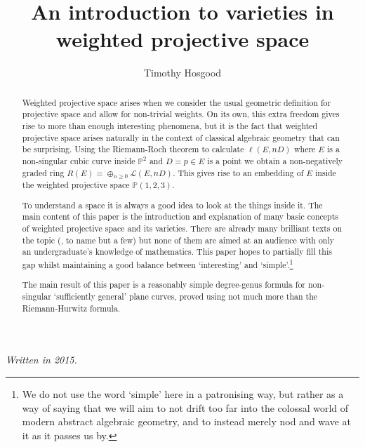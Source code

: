 \documentclass[10pt,notitlepage]{article}
\makeatletter
\newcommand{\draftwatermarkoff}{%
  \let\sc@watermark\@empty
}
\numberwithin{equation}{subsection}
\newcommand{\pee}{\mathbb{P}}
\makeatother
\begin{document}
\draftwatermarkoff

    
    \author{Timothy Hosgood}
    \title{An introduction to varieties in weighted projective space}
    \maketitle

    \emph{Written in 2015.}


    \begin{abstract}
        Weighted projective space arises when we consider the usual geometric definition for projective space and allow for non-trivial weights.
        On its own, this extra freedom gives rise to more than enough interesting phenomena, but it is the fact that weighted projective space arises naturally in the context of classical algebraic geometry that can be surprising.
        Using the Riemann-Roch theorem to calculate $\ell(E,nD)$ where $E$ is a non-singular cubic curve inside $\pee^2$ and $D=p\in E$ is a point we obtain a non-negatively graded ring $R(E)=\oplus_{n\geqslant0}\mathcal{L}(E,nD)$.
        This gives rise to an embedding of $E$ inside the weighted projective space $\pee(1,2,3)$.

        To understand a space it is always a good idea to look at the things inside it.
        The main content of this paper is the introduction and explanation of many basic concepts of weighted projective space and its varieties.
        There are already many brilliant texts on the topic (\cite{Reid:2002uy,IanoFletcher:2015wc}, to name but a few) but none of them are aimed at an audience with only an undergraduate's knowledge of mathematics.
        This paper hopes to partially fill this gap whilst maintaining a good balance between `interesting' and `simple'.\footnote{%
            We do not use the word `simple' here in a patronising way, but rather as a way of saying that we will aim to not drift too far into the colossal world of modern abstract algebraic geometry, and to instead merely nod and wave at it as it passes us by.
        }

        The main result of this paper is a reasonably simple degree-genus formula for non-singular `sufficiently general' plane curves, proved using not much more than the Riemann-Hurwitz formula.
    \end{abstract}

\end{document}
